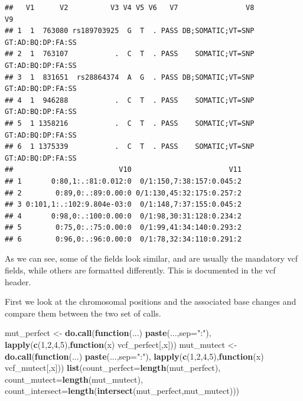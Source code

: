 \documentclass[]{article}
\newenvironment{Shaded}{\begin{snugshade}}{\end{snugshade}}
\newcommand{\ControlFlowTok}[1]{\textcolor[rgb]{0.13,0.29,0.53}{\textbf{#1}}}
\newcommand{\DataTypeTok}[1]{\textcolor[rgb]{0.13,0.29,0.53}{#1}}
\newcommand{\DecValTok}[1]{\textcolor[rgb]{0.00,0.00,0.81}{#1}}
\newcommand{\KeywordTok}[1]{\textcolor[rgb]{0.13,0.29,0.53}{\textbf{#1}}}
\newcommand{\NormalTok}[1]{#1}
\newcommand{\StringTok}[1]{\textcolor[rgb]{0.31,0.60,0.02}{#1}}
\begin{document}
\begin{verbatim}
##   V1      V2          V3 V4 V5 V6   V7                V8                V9
## 1  1  763080 rs189703925  G  T  . PASS DB;SOMATIC;VT=SNP GT:AD:BQ:DP:FA:SS
## 2  1  763107           .  C  T  . PASS    SOMATIC;VT=SNP GT:AD:BQ:DP:FA:SS
## 3  1  831651  rs28864374  A  G  . PASS DB;SOMATIC;VT=SNP GT:AD:BQ:DP:FA:SS
## 4  1  946288           .  C  T  . PASS    SOMATIC;VT=SNP GT:AD:BQ:DP:FA:SS
## 5  1 1358216           .  C  T  . PASS    SOMATIC;VT=SNP GT:AD:BQ:DP:FA:SS
## 6  1 1375339           .  C  T  . PASS    SOMATIC;VT=SNP GT:AD:BQ:DP:FA:SS
##                         V10                       V11
## 1       0:80,1:.:81:0.012:0  0/1:150,7:38:157:0.045:2
## 2        0:89,0:.:89:0.00:0 0/1:130,45:32:175:0.257:2
## 3 0:101,1:.:102:9.804e-03:0  0/1:148,7:37:155:0.045:2
## 4       0:98,0:.:100:0.00:0  0/1:98,30:31:128:0.234:2
## 5        0:75,0:.:75:0.00:0  0/1:99,41:34:140:0.293:2
## 6        0:96,0:.:96:0.00:0  0/1:78,32:34:110:0.291:2
\end{verbatim}

As we can see, some of the fields look similar, and are usually the
mandatory vcf fields, while others are formatted differently. This is
documented in the vcf header.

First we look at the chromosomal positions and the associated base
changes and compare them between the two set of calls.

\begin{Shaded}
\begin{Highlighting}[]
\NormalTok{mut_perfect <-}\StringTok{ }\KeywordTok{do.call}\NormalTok{(}\ControlFlowTok{function}\NormalTok{(...) }\KeywordTok{paste}\NormalTok{(...,}\DataTypeTok{sep=}\StringTok{":"}\NormalTok{),}
                       \KeywordTok{lapply}\NormalTok{(}\KeywordTok{c}\NormalTok{(}\DecValTok{1}\NormalTok{,}\DecValTok{2}\NormalTok{,}\DecValTok{4}\NormalTok{,}\DecValTok{5}\NormalTok{),}\ControlFlowTok{function}\NormalTok{(x) vcf_perfect[,x]))}
\NormalTok{mut_mutect <-}\StringTok{ }\KeywordTok{do.call}\NormalTok{(}\ControlFlowTok{function}\NormalTok{(...) }\KeywordTok{paste}\NormalTok{(...,}\DataTypeTok{sep=}\StringTok{":"}\NormalTok{),}
                      \KeywordTok{lapply}\NormalTok{(}\KeywordTok{c}\NormalTok{(}\DecValTok{1}\NormalTok{,}\DecValTok{2}\NormalTok{,}\DecValTok{4}\NormalTok{,}\DecValTok{5}\NormalTok{),}\ControlFlowTok{function}\NormalTok{(x) vcf_mutect[,x]))}
\KeywordTok{list}\NormalTok{(}\DataTypeTok{count_perfect=}\KeywordTok{length}\NormalTok{(mut_perfect),}
     \DataTypeTok{count_mutect=}\KeywordTok{length}\NormalTok{(mut_mutect),}
     \DataTypeTok{count_intersect=}\KeywordTok{length}\NormalTok{(}\KeywordTok{intersect}\NormalTok{(mut_perfect,mut_mutect)))}
\end{Highlighting}
\end{Shaded}
\end{document}

